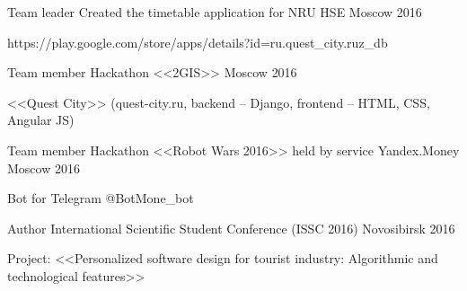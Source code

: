 


\begin{cventries}


\cventry
{Team leader} %
{Created the timetable application for NRU HSE} %
{Moscow} %
{2016} %
{ %
	\begin{cvitems}
		\item {https://play.google.com/store/apps/details?id=ru.quest\_city.ruz\_db}
	\end{cvitems}
}



\cventry
{Team member} %
{Hackathon <<2GIS>>} %
{Moscow} %
{2016} %
{ %
\begin{cvitems}
\item {<<Quest City>> (quest-city.ru, backend – Django, frontend – HTML, CSS, Angular JS)}
\end{cvitems}
}


\cventry
{Team member} %
{Hackathon <<Robot Wars 2016>> held by service Yandex.Money} %
{Moscow} %
{2016} %
{ %
\begin{cvitems}
\item {Bot for Telegram @BotMone\_bot}
\end{cvitems}
}


\cventry
{Author} %
{International Scientific Student Conference (ISSC 2016)} %
{Novosibirsk} %
{2016} %
{ %
\begin{cvitems}
\item {Project: <<Personalized software design for tourist industry: Algorithmic and technological features>>}
\end{cvitems}
}


\end{cventries}
